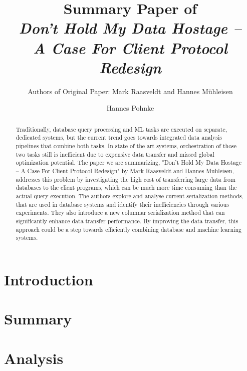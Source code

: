 \documentclass[sigconf]{acmart}
\begin{document}
\title{Summary Paper of \\ \textit{Don’t Hold My Data Hostage – \\A Case For Client Protocol Redesign}}
\subtitle{Authors of Original Paper: Mark Raasveldt and Hannes Mühleisen}


\author{Hannes Pohnke}


\begin{abstract}
Traditionally, database query processing and ML tasks are executed on separate, dedicated systems, but the current trend goes towards integrated data analysis pipelines that combine both tasks. In state of the art systems, orchestration of those two tasks still is inefficient due to expensive data transfer and missed global optimization potential. The paper we are summarizing, "Don’t Hold My Data Hostage – A Case For Client Protocol Redesign" by Mark Raasveldt and Hannes Muhleisen, addresses this problem by investigating the high cost of transferring large data from databases to the client programs, which can be much more time consuming than the actual query execution. The authors explore and analyse current serialization methods, that are used in database systems and identify their inefficiencies through various experiments. They also introduce a new columnar serialization method that can significantly enhance data transfer performance. By improving the data transfer, this approach could be a step towards efficiently combining database and machine learning systems.
\end{abstract}


\maketitle

\section{Introduction}

\section{Summary}

\section{Analysis}



\end{document}
